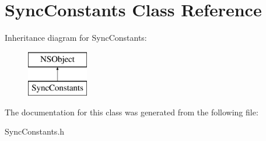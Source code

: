 \hypertarget{interface_sync_constants}{
\section{\-Sync\-Constants \-Class \-Reference}
\label{interface_sync_constants}
}
\-Inheritance diagram for \-Sync\-Constants\-:\begin{figure}[H]
\begin{center}
\leavevmode
\includegraphics[height=2.000000cm]{interface_sync_constants}
\end{center}
\end{figure}


\-The documentation for this class was generated from the following file\-:\begin{DoxyCompactItemize}
\item 
\-Sync\-Constants.\-h\end{DoxyCompactItemize}
